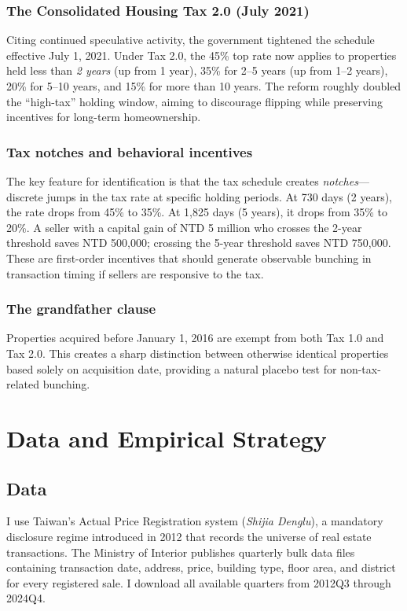 \documentclass[12pt]{article}
\begin{document}
\subsubsection*{The Consolidated Housing Tax 2.0 (July 2021)} Citing continued speculative activity, the government tightened the schedule effective July 1, 2021. Under Tax 2.0, the 45\% top rate now applies to properties held less than \textit{2 years} (up from 1 year), 35\% for 2--5 years (up from 1--2 years), 20\% for 5--10 years, and 15\% for more than 10 years. The reform roughly doubled the ``high-tax'' holding window, aiming to discourage flipping while preserving incentives for long-term homeownership.

\subsubsection*{Tax notches and behavioral incentives} The key feature for identification is that the tax schedule creates \textit{notches}---discrete jumps in the tax rate at specific holding periods. At 730 days (2 years), the rate drops from 45\% to 35\%. At 1,825 days (5 years), it drops from 35\% to 20\%. A seller with a capital gain of NTD 5 million who crosses the 2-year threshold saves NTD 500,000; crossing the 5-year threshold saves NTD 750,000. These are first-order incentives that should generate observable bunching in transaction timing if sellers are responsive to the tax.

\subsubsection*{The grandfather clause} Properties acquired before January 1, 2016 are exempt from both Tax 1.0 and Tax 2.0. This creates a sharp distinction between otherwise identical properties based solely on acquisition date, providing a natural placebo test for non-tax-related bunching.


\section{Data and Empirical Strategy}

\subsection{Data}

I use Taiwan's Actual Price Registration system (\textit{Shijia Denglu}), a mandatory disclosure regime introduced in 2012 that records the universe of real estate transactions. The Ministry of Interior publishes quarterly bulk data files containing transaction date, address, price, building type, floor area, and district for every registered sale. I download all available quarters from 2012Q3 through 2024Q4.
\end{document}
